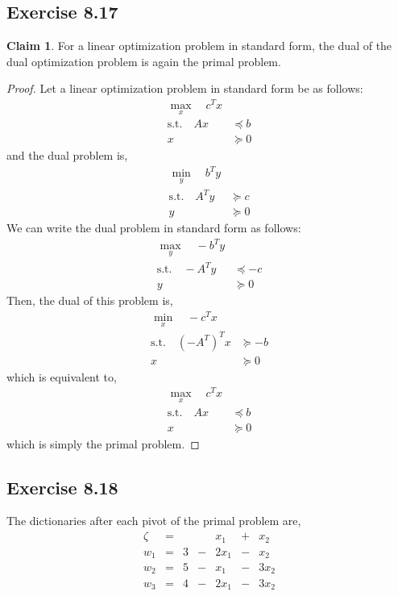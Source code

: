 \documentclass[letterpaper,12pt]{article}
\theoremstyle{definition}
\newtheorem{claim}[theorem]{Claim}
\begin{document}
\subsection*{Exercise 8.17}
\begin{claim}
	For a linear optimization problem in standard form, the dual of the dual optimization problem is again the primal problem. 
\end{claim}
\begin{proof}
	Let a linear optimization problem in standard form be as follows:
	\begin{align*}
	\max_x \quad
	c^T x& \\
	\text{s.t.} \quad
	Ax &\preceq b \\
	x &\succeq 0
	\end{align*}
	and the dual problem is,
	\begin{align*}
	\min_y \quad
	b^T y& \\
	\text{s.t.} \quad
	A^Ty &\succeq c \\
	y &\succeq 0
	\end{align*}
	We can write the dual problem in standard form as follows:
	\begin{align*}
	\max_y \quad
	-b^T y& \\
	\text{s.t.} \quad
	-A^Ty &\preceq -c \\
	y &\succeq 0
	\end{align*}
	Then, the dual of this problem is,
	\begin{align*}
	\min_x \quad
	-c^T x& \\
	\text{s.t.} \quad
	(-A^T)^Tx &\succeq -b \\
	x &\succeq 0
	\end{align*}
	which is equivalent to,
	\begin{align*}
	\max_x \quad
	c^T x& \\
	\text{s.t.} \quad
	Ax &\preceq b \\
	x &\succeq 0
	\end{align*}
	which is simply the primal problem. 
\end{proof}

\subsection*{Exercise 8.18}
The dictionaries after each pivot of the primal problem are,
\begin{equation*}
\begin{matrix}
\zeta &= & & & x_1 &+& x_2 \\
\hline
w_1 &= &3 &-& 2x_1 &-& x_2\\
w_2 &= &5 &-& x_1 &-& 3x_2 \\
w_3 &= &4 &- & 2x_1 &-& 3x_2
\end{matrix}
\end{equation*}
\end{document}
